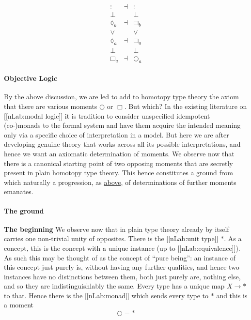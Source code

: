 \documentclass[12pt,titlepage]{article}
\newcommand{\itexarray}[1]{\begin{matrix}#1\end{matrix}}
\theoremstyle{plain}
\theoremstyle{definition}
\theoremstyle{remark}
\begin{document}
\begin{displaymath}
\itexarray{
     \vdots  &\dashv& \vdots
     \\
     \bot && \bot
     \\
     \lozenge_b &\dashv& \Box_b
     \\
     \vee && \vee
     \\
     \lozenge_a &\dashv& \Box_a
     \\
     \bot && \bot
     \\
     \Box_a &\dashv& \bigcirc_a
  }
\end{displaymath}
\hypertarget{ObjectiveLogic}{}\paragraph*{{Objective Logic}}\label{ObjectiveLogic}
By the above discussion, we are led to add to homotopy type theory the axiom that there are various moments $\bigcirc$ or $\Box$. But which?
In the existing literature on [[nLab:modal logic]] it is tradition to consider unspecified idempotent (co-)monads to the formal system and have them acquire the intended meaning only via a specific choice of interpretation in a model. But here we are after developing genuine theory that works across all its possible interpretations, and hence we want an axiomatic determination of moments.
We observe now that there is a canonical starting point of two opposing moments that are secretly present in plain homotopy type theory. This hence constitutes a ground from which naturally a progression, as \hyperlink{Progression}{above}, of determinations of further moments emanates.
\hypertarget{TheGround}{}\paragraph*{{The ground}}\label{TheGround}
\textbf{The beginning}
We observe now that in plain type theory already by itself carries one non-trivial unity of opposites.
There is the [[nLab:unit type]] $\ast$. As a concept, this is the concept with a unique instance (up to [[nLab:equivalence]]). As such this may be thought of as the concept of ``pure being'': an instance of this concept just purely is, without having any further qualities, and hence two instances have no distinctions between them, both just purely are, nothing else, and so they are indistinguishlably the same.
Every type has a unique map $X\to \ast$ to that. Hence there is the [[nLab:monad]] which sends every type to $\ast$ and this is a moment
\begin{displaymath}
\bigcirc = \ast
\end{displaymath}
\end{document}
